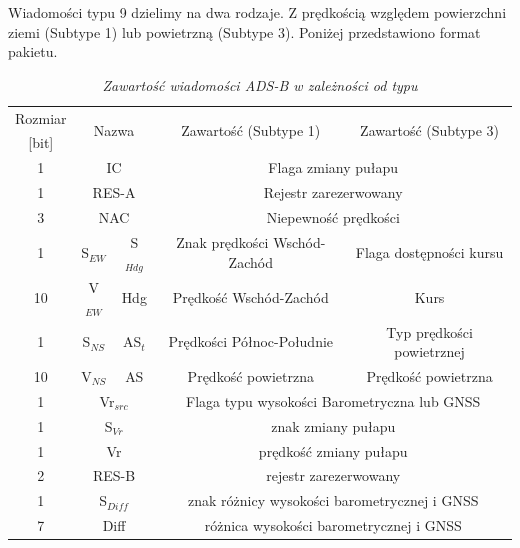 \documentclass[eng,printmode]{mgr}
\begin{document}
Wiadomości typu 9 dzielimy na dwa rodzaje. Z prędkością względem powierzchni ziemi (Subtype 1) lub powietrzną (Subtype 3). Poniżej przedstawiono format pakietu.

\begin{table}[htb]
\def\arraystretch{1.3}%
\caption{\textit{ Zawartość wiadomości ADS-B w zależności od typu}}
\label{tab:adsb}
  \centering
  \def\arraystretch{1.3}%
  \begin{tabular}{|c|c|c|c|c|}
  \hline
  \multicolumn{1}{|c|}{Rozmiar} & \multicolumn{2}{c|}{\multirow{2}{*}{Nazwa}} & \multicolumn{1}{c|}{\multirow{2}{*}{Zawartość (Subtype 1)}}  & \multicolumn{1}{c|}{\multirow{2}{*}{Zawartość (Subtype 3)}}\\
  \multicolumn{1}{|c|}{[bit]} & \multicolumn{2}{c|}{} & \multicolumn{1}{c|}{}& \multicolumn{1}{c|}{}\\\cline{1-5}
  
  \multicolumn{1}{|c|}{1} & \multicolumn{2}{c|}{IC} & \multicolumn{2}{c|}{Flaga zmiany pułapu}\\\cline{1-5}
  \multicolumn{1}{|c|}{1} & \multicolumn{2}{c|}{RES-A} & \multicolumn{2}{c|}{Rejestr zarezerwowany}\\\cline{1-5}
  \multicolumn{1}{|c|}{3} & \multicolumn{2}{c|}{NAC} & \multicolumn{2}{c|}{Niepewność prędkości}\\\cline{1-5}
  \multicolumn{1}{|c|}{1} & \multicolumn{1}{c|}{S$_{EW}$} & \multicolumn{1}{c|}{S$_{Hdg}$} & \multicolumn{1}{c|}{Znak prędkości Wschód-Zachód} & \multicolumn{1}{c|}{Flaga dostępności kursu} \\\cline{1-5}
  \multicolumn{1}{|c|}{10} & \multicolumn{1}{c|}{V$_{EW}$} & \multicolumn{1}{c|}{Hdg} & \multicolumn{1}{c|}{Prędkość Wschód-Zachód}& \multicolumn{1}{c|}{Kurs}\\\cline{1-5}
  \multicolumn{1}{|c|}{1} & \multicolumn{1}{c|}{S$_{NS}$} & \multicolumn{1}{c|}{AS$_t$} & \multicolumn{1}{c|}{Prędkości Północ-Południe} & \multicolumn{1}{c|}{Typ prędkości powietrznej}\\\cline{1-5}
  \multicolumn{1}{|c|}{10} & \multicolumn{1}{c|}{V$_{NS}$} & \multicolumn{1}{c|}{AS}  & \multicolumn{1}{c|}{Prędkość powietrzna}& \multicolumn{1}{c|}{Prędkość powietrzna}\\\cline{1-5}
  \multicolumn{1}{|c|}{1} & \multicolumn{2}{c|}{Vr$_{src}$} & \multicolumn{2}{c|}{Flaga typu wysokości Barometryczna lub GNSS}\\\cline{1-5}
  \multicolumn{1}{|c|}{1} & \multicolumn{2}{c|}{S$_{Vr}$} & \multicolumn{2}{c|}{znak zmiany pułapu}\\\cline{1-5}
  \multicolumn{1}{|c|}{1} & \multicolumn{2}{c|}{Vr} & \multicolumn{2}{c|}{prędkość zmiany pułapu}\\\cline{1-5}
  \multicolumn{1}{|c|}{2} & \multicolumn{2}{c|}{RES-B} & \multicolumn{2}{c|}{rejestr zarezerwowany}\\\cline{1-5}
  \multicolumn{1}{|c|}{1} & \multicolumn{2}{c|}{S$_{Diff}$} & \multicolumn{2}{c|}{znak różnicy wysokości barometrycznej i GNSS}\\\cline{1-5}
  \multicolumn{1}{|c|}{7} & \multicolumn{2}{c|}{Diff} & \multicolumn{2}{c|}{różnica wysokości barometrycznej i GNSS}\\\cline{1-5}
       

\end{tabular}
\end{table}
\end{document}
